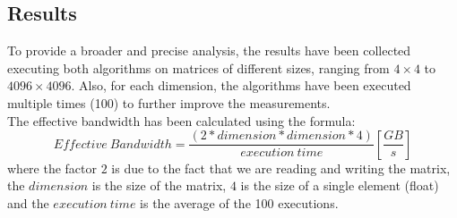 \documentclass{article}
\begin{document}
\subsection{Results}
To provide a broader and precise analysis, the results have been collected executing both algorithms on matrices of different sizes,
ranging from $4 \times 4$ to $4096 \times 4096$. Also, for each dimension, the algorithms have been executed multiple times (100) to further improve the measurements. \\
The effective bandwidth has been calculated using the formula: \\
\begin{equation*}
    Effective \: Bandwidth = \frac{\left ( 2 * dimension * dimension * 4 \right )}{execution\: time}
    \left[\frac{GB}{s}\right]
\end{equation*}
where the factor $2$ is due to the fact that we are reading and writing the matrix, the $dimension$ is the size of the matrix, 
$4$ is the size of a single element (float) and the $execution \: time$ is the average of the 100 executions. \\
\end{document}
